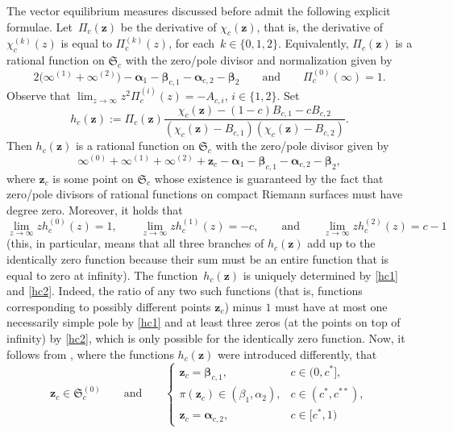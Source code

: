 \documentclass[10pt,a4paper]{amsart}
\numberwithin{equation}{section}
\newcommand{\RS}{\boldsymbol{\mathfrak{S}}}
\newcommand{\z}	{{\boldsymbol z}}
\begin{document}
The vector equilibrium measures discussed before admit the following explicit formulae. Let~$ \Pi_c(\z) $ be the derivative of $ \chi_c(\z) $, that is, the derivative of $ \chi_c^{(k)}(z) $ is equal to $ \Pi_c^{(k)}(z) $, for each~${k\in\{0,1,2\}}$. Equivalently, $ \Pi_c(\z) $ is a rational function on $ \RS_c $ with the zero/pole divisor and normalization given by
\begin{equation}
\label{Pin}
2\bigl(\infty^{(1)} + \infty^{(2)} \bigr) - \boldsymbol\alpha_1 - \boldsymbol\beta_{c,1} - \boldsymbol\alpha_{c,2} - \boldsymbol\beta_2 \qquad \text{and}\qquad  \Pi_c^{(0)}(\infty) =1.
\end{equation}
Observe that $ \lim_{z\to\infty} z^2\Pi_c^{(i)}(z) = -A_{c,i} $, $ i\in\{1,2\} $. Set
\begin{equation}
\label{h_chi}
h_c(\z) := \Pi_c(\z) \frac{\chi_c(\z) - (1-c)B_{c,1} - c B_{c,2}}{(\chi_c(\z)-B_{c,1})(\chi_c(\z)-B_{c,2})}.
\end{equation}
Then $ h_c(\z) $ is a rational function on $ \RS_c $ with the zero/pole divisor given by
\begin{equation}
\label{hc1}
\infty^{(0)} + \infty^{(1)} + \infty^{(2)} + \z_c - \boldsymbol\alpha_1 - \boldsymbol\beta_{c,1} - \boldsymbol\alpha_{c,2} - \boldsymbol\beta_2,
\end{equation}
where $ \z_c $ is some point on $ \RS_c $ whose existence is guaranteed by the fact that zero/pole divisors of rational functions on compact Riemann surfaces must have degree zero. Moreover, it holds that
\begin{equation}
\label{hc2}
\lim_{z\to\infty} zh_c^{(0)}(z) = 1, \qquad \lim_{z\to\infty} zh_c^{(1)}(z) = -c, \qquad \text{and}\qquad  \lim_{z\to\infty} zh_c^{(2)}(z) = c-1
\end{equation}
(this, in particular, means that all three branches of $ h_c(\z) $ add up to the identically zero function because their sum must be an entire function that is equal to zero at infinity). The function~$ h_c(\z) $ is uniquely determined by \eqref{hc1} and \eqref{hc2}. Indeed, the ratio of any two such functions (that is, functions corresponding to possibly different points $ \z_c $) minus $ 1 $ must have at most one necessarily simple pole by \eqref{hc1} and at least three zeros (at the points on top of infinity) by \eqref{hc2}, which is only possible for the identically zero function. Now, it follows from \cite[Proposition~2.3]{Ya16}, where the functions $ h_c(\z) $ were introduced differently, that
\begin{equation}
\label{point_zc}
\z_c\in \RS_c^{(0)} \qquad \text{and}\qquad
\begin{cases}
\z_c=\boldsymbol\beta_{c,1}, & c\in(0,c^*], \\
\pi(\z_c) \in (\beta_1,\alpha_2), & c\in(c^*,c^{**}), \\
\z_c=\boldsymbol\alpha_{c,2}, & c\in[c^*,1)
\end{cases}
\end{equation}
\end{document}
